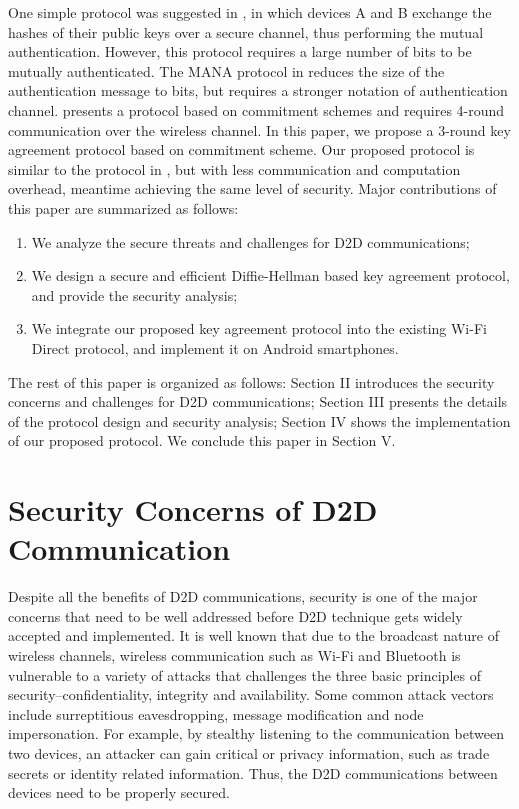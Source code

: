 \documentclass[conference]{IEEEtran}
\begin{document}
One simple protocol was suggested in \cite{tts}, in which devices A and B exchange the hashes of their public keys over a secure channel, thus performing the mutual authentication. However, this protocol requires a large number of bits to be mutually authenticated. The MANA protocol in \cite{mana} reduces the size of the authentication message to  bits, but requires a stronger notation of authentication channel. \cite{ka} presents a protocol based on commitment schemes and requires 4-round communication over the wireless channel. In this paper, we propose a 3-round key agreement protocol based on commitment scheme. Our proposed protocol is similar to the protocol in \cite{ka}, but with less communication and computation overhead, meantime achieving the same level of security. Major contributions of this paper are summarized as follows:
\begin{enumerate}
  \item We analyze the secure threats and challenges for D2D communications;
  \item We design a secure and efficient Diffie-Hellman based key agreement protocol, and provide the security analysis;
  \item We integrate our proposed key agreement protocol into the existing Wi-Fi Direct protocol, and implement it on Android smartphones.
\end{enumerate}

The rest of this paper is organized as follows: Section II introduces the security concerns and challenges for D2D communications; Section III presents the details of the protocol design and security analysis; Section IV shows the implementation of our proposed protocol. We conclude this paper in Section V.

\section{Security Concerns of D2D Communication \label{sec2}}
Despite all the benefits of D2D communications, security is one of the major concerns that need to be well addressed before D2D technique gets widely accepted and implemented. It is well known that due to the broadcast nature of wireless channels, wireless communication such as Wi-Fi and Bluetooth is vulnerable to a variety of attacks that challenges the three basic principles of security--confidentiality, integrity and availability. Some common attack vectors include surreptitious eavesdropping, message modification and node impersonation. For example, by stealthy listening to the communication between two devices, an attacker can gain critical or privacy information, such as trade secrets or identity related information. Thus, the D2D communications between devices need to be properly secured. 
\end{document}
